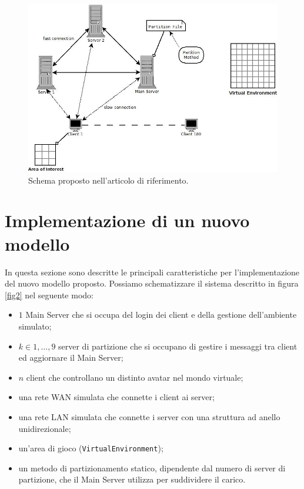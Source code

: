 \documentclass{article}
\begin{document}
\begin{figure}
\label{fig1}
\begin{center}
\includegraphics[scale=0.50]{schema.jpeg}
\end{center}
\caption{Schema proposto nell'articolo di riferimento.}
\end{figure}


\section{Implementazione di un nuovo modello}

In questa sezione sono descritte le principali caratteristiche per 
l'implementazione del nuovo modello proposto. Possiamo schematizzare il
sistema descritto in figura \ref{fig2} nel seguente modo:
\begin{itemize}
\item
$1$ Main Server che si occupa del login dei client e della gestione
dell'ambiente simulato;
\item
$k \in {1, \ldots, 9}$ server di partizione che si occupano di gestire i messaggi
tra client ed aggiornare il Main Server;
\item
$n$ client che controllano un distinto avatar nel mondo virtuale;
\item
una rete WAN simulata che connette i client ai server;
\item
una rete LAN simulata che connette i server con una struttura ad anello 
unidirezionale;
\item
un'area di gioco (\texttt{VirtualEnvironment});
\item
un metodo di partizionamento statico, dipendente dal numero di server di
partizione, che il Main Server utilizza per suddividere il carico.
\end{itemize}
\end{document}
